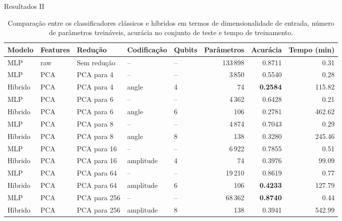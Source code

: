 \begin{frame}{Resultados II}
  \begin{table}[ht]
\centering
\scriptsize
\setlength{\tabcolsep}{3.5pt}
\renewcommand{\arraystretch}{1.12}

\begin{tabular}{lllllrrr}
\toprule
Modelo
& Features
& Redução
& Codificação
& Qubits
& Parâmetros
& Acurácia
& Tempo (min) \\
\midrule

MLP
& raw
& Sem redução
& --
& --
& 133\,898
& 0.8711
& 0.31 \\

MLP
& PCA
& PCA para 4
& --
& --
& 3\,850
& 0.5540
& 0.28 \\

\rowcolor{red!20}
Híbrido
& PCA
& PCA para 4
& angle
& 4
& 74
& \textbf{0.2584}
& 115.82 \\

MLP
& PCA
& PCA para 6
& --
& --
& 4\,362
& 0.6428
& 0.21 \\

Híbrido
& PCA
& PCA para 6
& angle
& 6
& 106
& 0.2781
& 462.62 \\

MLP
& PCA
& PCA para 8
& --
& --
& 4\,874
& 0.7043
& 0.29 \\

Híbrido
& PCA
& PCA para 8
& angle
& 8
& 138
& 0.3280
& 245.46 \\

MLP
& PCA
& PCA para 16
& --
& --
& 6\,922
& 0.7855
& 0.51 \\

Híbrido
& PCA
& PCA para 16
& amplitude
& 4
& 74
& 0.3976
& 99.09 \\

MLP
& PCA
& PCA para 64
& --
& --
& 19\,210
& 0.8619
& 0.77 \\

\rowcolor{yellow!25}
Híbrido
& PCA
& PCA para 64
& amplitude
& 6
& 106
& \textbf{0.4233}
& 127.79 \\

\rowcolor{green!20}
MLP
& PCA
& PCA para 256
& --
& --
& 68\,362
& \textbf{0.8740}
& 0.44 \\

Híbrido
& PCA
& PCA para 256
& amplitude
& 8
& 138
& 0.3941
& 542.99 \\

\bottomrule
\end{tabular}

\caption{
Comparação entre os classificadores clássicos e híbridos em termos de
dimensionalidade de entrada, número de parâmetros treináveis, acurácia no conjunto de teste e tempo de treinamento.
}
\label{tab:resultados_classificadores}
\end{table}
\end{frame}

